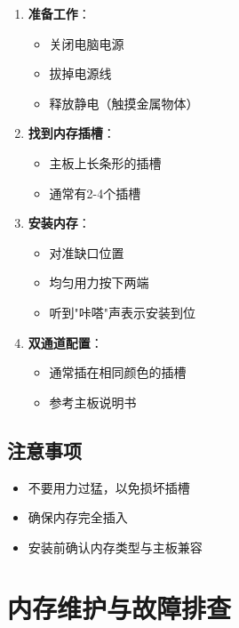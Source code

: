\documentclass[12pt,UTF8]{ctexbook}
\begin{document}
\begin{enumerate}
    \item \textbf{准备工作}：
    \begin{itemize}[leftmargin=2em]
        \item 关闭电脑电源
        \item 拔掉电源线
        \item 释放静电（触摸金属物体）
    \end{itemize}
    
    \item \textbf{找到内存插槽}：
    \begin{itemize}[leftmargin=2em]
        \item 主板上长条形的插槽
        \item 通常有2-4个插槽
    \end{itemize}
    
    \item \textbf{安装内存}：
    \begin{itemize}[leftmargin=2em]
        \item 对准缺口位置
        \item 均匀用力按下两端
        \item 听到"咔嗒"声表示安装到位
    \end{itemize}
    
    \item \textbf{双通道配置}：
    \begin{itemize}[leftmargin=2em]
        \item 通常插在相同颜色的插槽
        \item 参考主板说明书
    \end{itemize}
\end{enumerate}

\section{注意事项}

\begin{itemize}[leftmargin=2em]
    \item 不要用力过猛，以免损坏插槽
    \item 确保内存完全插入
    \item 安装前确认内存类型与主板兼容
\end{itemize}

\chapter{内存维护与故障排查}
\end{document}
